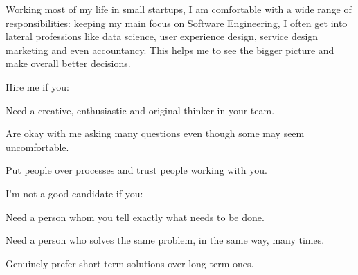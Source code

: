 


\begin{cvparagraph}

Working most of my life in small startups, I am comfortable with a wide range of responsibilities: keeping my main focus on Software Engineering, I often get into lateral professions like data science, user experience design, service design marketing and even accountancy. This helps me to see the bigger picture and make overall better decisions.

Hire me if you:

\begin{cvlistitems}
  \item Need a creative, enthusiastic and original thinker in your team.
  \item Are okay with me asking many questions even though some may seem uncomfortable.
  \item Put people over processes and trust people working with you.
\end{cvlistitems}

I’m not a good candidate if you:

\begin{cvlistitems}
  \item Need a person whom you tell exactly what needs to be done.
  \item Need a person who solves the same problem, in the same way, many times.
  \item Genuinely prefer short-term solutions over long-term ones.
\end{cvlistitems}

\end{cvparagraph}
